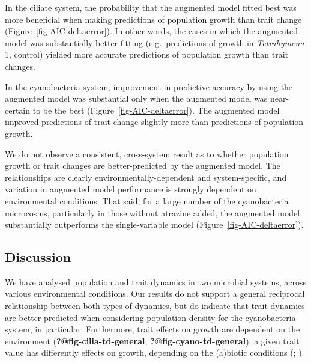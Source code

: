 \documentclass[
  letterpaper,
  DIV=11,
  numbers=noendperiod]{scrartcl}
\begin{document}
In the ciliate system, the probability that the augmented model fitted
best was more beneficial when making predictions of population growth
than trait change (Figure~\ref{fig-AIC-deltaerror}). In other words, the
cases in which the augmented model was substantially-better fitting
(e.g.~predictions of growth in \emph{Tetrahymena} 1, control) yielded
more accurate predictions of population growth than trait changes.

In the cyanobacteria system, improvement in predictive accuracy by using
the augmented model was substantial only when the augmented model was
near-certain to be the best (Figure~\ref{fig-AIC-deltaerror}). The
augmented model improved predictions of trait change slightly more than
predictions of population growth.

We do not observe a consistent, cross-system result as to whether
population growth or trait changes are better-predicted by the augmented
model. The relationships are clearly environmentally-dependent and
system-specific, and variation in augmented model performance is
strongly dependent on environmental conditions. That said, for a large
number of the cyanobacteria microcosms, particularly in those without
atrazine added, the augmented model substantially outperforms the
single-variable model (Figure~\ref{fig-AIC-deltaerror}).

\subsection{Discussion}\label{sec-DAE_discussion}

We have analysed population and trait dynamics in two microbial systems,
across various environmental conditions. Our results do not support a
general reciprocal relationship between both types of dynamics, but do
indicate that trait dynamics are better predicted when considering
population density for the cyanobacteria system, in particular.
Furthermore, trait effects on growth are dependent on the environment
(\textbf{?@fig-cilia-td-general}, \textbf{?@fig-cyano-td-general}): a
given trait value has differently effects on growth, depending on the
(a)biotic conditions (;
).
\end{document}
